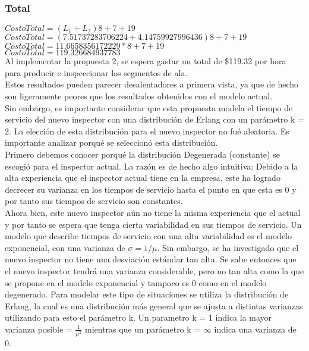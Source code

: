 \documentclass{article}
\begin{document}
\subsubsection{Total}
\noindent $CostoTotal = \left( L_{1} + L_{2} \right) 8 + 7 + 19$ \\
$CostoTotal = \left( 7.51737283706224 + 4.14759927996436\right) 8 + 7 + 19$ \\
$CostoTotal = 11.6658356172229*8 + 7 + 19$\\
$CostoTotal = 119.326684937783$\\
Al implementar la propuesta 2, se espera gastar un total de \$119.32 por hora
para producir e inspeccionar los segmentos de ala. \\
Estos resultados pueden parecer
desalentadores a primera vista, ya que de hecho son ligeramente peores que los
resultados obtenidos con el modelo actual. \\
Sin embargo, es importante considerar que esta
propuesta modela el tiempo de servicio del nuevo inspector con una distribución
de Erlang con un parámetro k = 2. 
La elección de esta distribución para el nuevo inspector no fué aleatoria. Es 
importante analizar porqué se seleccionó esta distribución.\\
Primero debemos conocer porqué la distribución Degenerada (constante) se escogió
para el inspector actual. La razón es de hecho algo intuitiva: 
Debido a la alta experiencia que el inspector actual tiene en la empresa, este
ha logrado decrecer su varianza en los tiempos de servicio hasta el punto en que
esta es 0 y por tanto sus tiempos de servicio son constantes. \\
Ahora bien, este nuevo inspector aún no tiene la misma experiencia que el 
actual y por tanto se espera que tenga cierta variabilidad en sus tiempos
de servicio. Un modelo que describe tiempos de servicio con una alta variabilidad
es el modelo exponencial, con una varianza de $\sigma = 1/\mu$. Sin embargo, 
se ha investigado que el nuevo inspector no tiene una desviación estándar tan alta.
Se sabe entonces que el nuevo inspector tendrá una varianza considerable, pero 
no tan alta como la que se propone en el modelo exponencial y tampoco es 0 como en 
el modelo degenerado. Para modelar este tipo de situaciones se utiliza la 
distribución de Erlang, la cual es una distribución más general que se 
ajusta a distintas varianzas utilizando para esto el parámetro k.
Un parametro k  = 1 indica la mayor varianza posible = $\frac{1}{\mu^{2}}$
mientras que un parámetro k = $\infty$ indica una varianza de 0.
\end{document}
